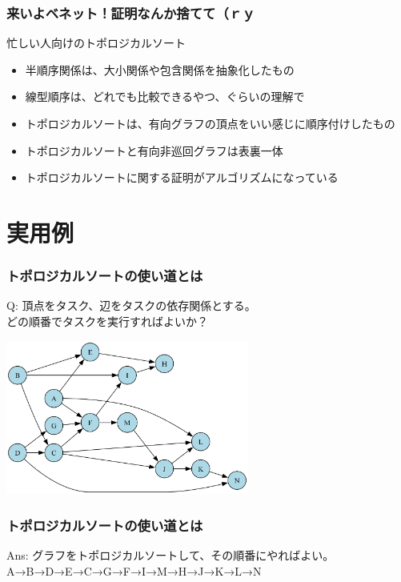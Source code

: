 \documentclass[aspectratio=169,dvipdfmx,12pt,notheorems]{beamer}
\theoremstyle{definition}
\begin{document}
\begin{frame}\frametitle{来いよベネット！証明なんか捨てて（ｒｙ}

\begin{block}{忙しい人向けのトポロジカルソート}
\begin{itemize}
\item 半順序関係は、大小関係や包含関係を抽象化したもの
\item 線型順序は、どれでも比較できるやつ、ぐらいの理解で
\item トポロジカルソートは、有向グラフの頂点をいい感じに順序付けしたもの
\item トポロジカルソートと有向非巡回グラフは表裏一体
\item トポロジカルソートに関する証明がアルゴリズムになっている
\end{itemize}
\end{block}

\end{frame}

\section{実用例}

\begin{frame}\frametitle{トポロジカルソートの使い道とは}

\begin{exampleblock}{Q: 頂点をタスク、辺をタスクの依存関係とする。 \\ どの順番でタスクを実行すればよいか？}
\begin{center}
\includegraphics[width=8cm]{complex_dag_example.png}
\end{center}
\end{exampleblock}

\end{frame}

\begin{frame}\frametitle{トポロジカルソートの使い道とは}

\begin{block}{Ans: グラフをトポロジカルソートして、その順番にやればよい。}
A→B→D→E→C→G→F→I→M→H→J→K→L→N
\end{block}

\end{frame}
\end{document}

